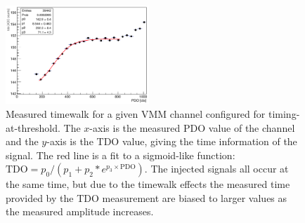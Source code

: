 \begin{figure}[!htb]
    \begin{center}
        \includegraphics[width=0.48\textwidth]{figures/nsw/calibration/time_walk}
        \caption{
            Measured timewalk for a given VMM channel configured for timing-at-threshold.
            The $x$-axis is the measured PDO value of the channel and the $y$-axis is the
            TDO value, giving the time information of the signal.
            The red line is a fit to a sigmoid-like function: $\text{TDO} =  p_0 / (p_1 + p_2 * e^{p_3 \times \text{PDO}})$.
            The injected signals all occur at the same time, but due to the timewalk effects
            the measured time provided by the TDO measurement are biased to larger values as the measured amplitude
            increases.
        }
        \label{fig:time_walk}
    \end{center}
\end{figure}

